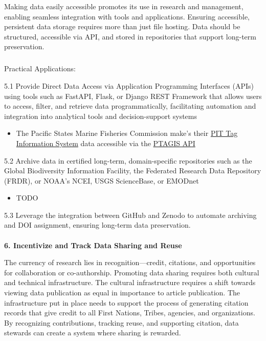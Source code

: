 \documentclass[
  letterpaper,
  DIV=11,
  numbers=noendperiod]{scrartcl}
\makeatletter
\let\oldparagraph\paragraph
\renewcommand{\paragraph}{
    \@ifstar
      \xxxParagraphStar
      \xxxParagraphNoStar
  }
\newcommand{\xxxParagraphStar}[1]{\oldparagraph*{#1}\mbox{}}
\newcommand{\xxxParagraphNoStar}[1]{\oldparagraph{#1}\mbox{}}
\let\oldsubparagraph\subparagraph
\renewcommand{\subparagraph}{
    \@ifstar
      \xxxSubParagraphStar
      \xxxSubParagraphNoStar
  }
\newcommand{\xxxSubParagraphStar}[1]{\oldsubparagraph*{#1}\mbox{}}
\newcommand{\xxxSubParagraphNoStar}[1]{\oldsubparagraph{#1}\mbox{}}
\providecommand{\tightlist}{%
  \setlength{\itemsep}{0pt}\setlength{\parskip}{0pt}}\usepackage{longtable,booktabs,array}
\makeatother
\begin{document}
Making data easily accessible promotes its use in research and
management, enabling seamless integration with tools and applications.
Ensuring accessible, persistent data storage requires more than just
file hosting. Data should be structured, accessible via API, and stored
in repositories that support long-term preservation.

\subparagraph{Practical Applications:}\label{practical-applications-4}

5.1 Provide Direct Data Access via Application Programming Interfaces
(APIs) using tools such as FastAPI, Flask, or Django REST Framework that
allows users to access, filter, and retrieve data programmatically,
facilitating automation and integration into analytical tools and
decision-support systems

\begin{itemize}
\tightlist
\item
  The Pacific States Marine Fisheries Commission make's their
  \href{https://www.psmfc.org/program/pit-tag-information-systems-ptagis}{PIT
  Tag Information System} data accessible via the
  \href{https://api.ptagis.org/index.html\#:~:text=PTAGIS\%20API\%20Gets\%20a\%20list,PTAGIS\%20and\%20currently\%20contributing\%20data}{PTAGIS
  API}
\end{itemize}

5.2 Archive data in certified long-term, domain-specific repositories
such as the Global Biodiversity Information Facility, the Federated
Research Data Repository (FRDR), or NOAA's NCEI, USGS ScienceBase, or
EMODnet

\begin{itemize}
\tightlist
\item
  TODO
\end{itemize}

5.3 Leverage the integration between GitHub and Zenodo to automate
archiving and DOI assignment, ensuring long-term data preservation.

\paragraph{\texorpdfstring{\textbf{6. Incentivize and Track Data Sharing
and
Reuse}}{6. Incentivize and Track Data Sharing and Reuse}}\label{incentivize-and-track-data-sharing-and-reuse}

The currency of research lies in recognition---credit, citations, and
opportunities for collaboration or co-authorship. Promoting data sharing
requires both cultural and technical infrastructure. The cultural
infrastructure requires a shift towards viewing data publication as
equal in importance to article publication. The infrastructure put in
place needs to support the process of generating citation records that
give credit to all First Nations, Tribes, agencies, and organizations.
By recognizing contributions, tracking reuse, and supporting citation,
data stewards can create a system where sharing is rewarded.
\end{document}
